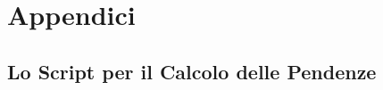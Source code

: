 \appendix
\chapter*{Appendici}
\renewcommand{\thesection}{\Alph{section}}
	\captionsetup{aboveskip=1pt, belowskip=30pt} %

	\section{Lo Script per il Calcolo delle Pendenze}\label{appendix:model}
		\inputminted[autogobble, frame=lines, framesep=3mm]{python}{code/process_routes}
